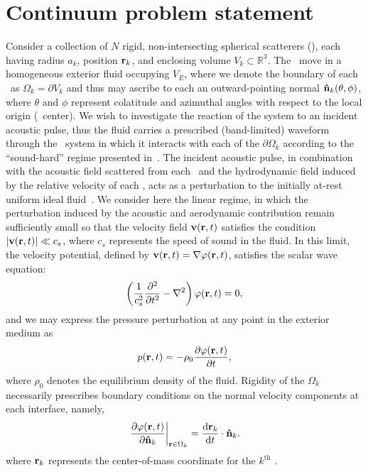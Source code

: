 \section{Continuum problem statement}

Consider a collection of $N$ rigid, non-intersecting spherical scatterers (\bubbles), each having radius $a_k$, position $\vb{r}_k$, and enclosing volume $V_k \subset \mathbb{R}^3$.
The \bubbles\ move in a homogeneous exterior fluid occupying $V_E$, where we denote the boundary of each \bubble\ as $\Omega_k = \partial V_k$ and thus may ascribe  to each an outward-pointing normal $\vu{n}_k\qty(\theta, \phi)$,
where $\theta$ and $\phi$ represent colatitude and azimuthal angles with respect to the local origin (\bubble\ center).
We wish to investigate the reaction of the system to an incident acoustic pulse, thus the fluid carries a prescribed (band-limited) waveform through the \bubble\ system in which it interacts with each of the $\partial \Omega_k$ according to the ``sound-hard'' regime presented in~\cite{Li2014}. 
The incident acoustic pulse, in combination with the acoustic field scattered from each \bubble\ and the hydrodynamic field induced by the relative velocity of each \bubble, acts as a perturbation to the initially at-rest uniform ideal fluid~\cite{Myers1992, Landau2013}.
We consider here the linear regime, in which the perturbation induced by the acoustic and aerodynamic contribution remain sufficiently small so that the velocity field $\vb{v}(\vb{r}, t)$ satisfies the condition $\abs{\vb{v}(\vb{r}, t)} \ll c_s $, where $c_s$ represents the speed of sound in the fluid.
In this limit, the velocity potential, defined by $\vb{v}(\vb{r}, t) = \nabla \varphi\qty(\vb{r}, t)$, satisfies the scalar wave equation:
\begin{equation}
    \left(\frac{1}{c_s^2} \frac{\partial^2}{\partial t^2}-\nabla^2\right) \varphi\qty(\vb{r}, t) = 0,
  \label{eq:Helmholtz}
\end{equation}
and we may express the pressure perturbation at any point in the exterior medium as
\begin{equation} \label{eq:Bernoulli}
  p\qty(\vb{r}, t) = - \rho_0\pdv{\varphi\qty(\vb{r}, t)}{t},
\end{equation}
where $\rho_0$ denotes the equilibrium density of the fluid.
Rigidity of the $\Omega_k$ necessarily prescribes boundary conditions on the normal velocity components at each interface, namely,
\begin{equation}
  \left.\pdv{\varphi(\vb{r},t)}{\vu{n}_k}\right|_{\vb{r} \in \Omega_k} = \dv{\vb{r}_k}{t} \cdot \vu{n}_k.
  \label{eq:boundary_conditions}
\end{equation}
where $\vb{r}_k$ represents the center-of-mass coordinate for the $k^\text{th}$ \bubble.

